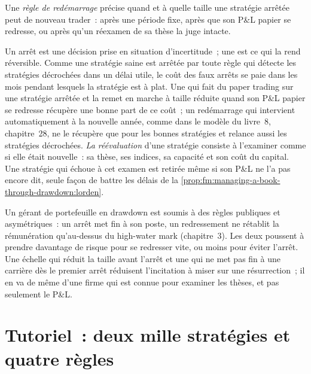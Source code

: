 \begin{definition}\label{def:fm:managing-a-book-through-drawdown:restart}
Une \emph{règle de redémarrage} précise quand et à quelle taille une stratégie arrêtée peut de nouveau trader~: après une période fixe, après que son
P\&L papier se redresse, ou après qu'un réexamen de sa thèse la juge intacte.
\end{definition}

Un arrêt est une décision prise en situation d'incertitude~; une  est ce qui la rend réversible. Comme une stratégie saine est arrêtée par toute règle qui
détecte les stratégies décrochées dans un délai utile, le coût des faux arrêts se paie dans les mois pendant lesquels la stratégie est à plat. Une  qui fait du paper trading sur une stratégie arrêtée
et la remet en marche à taille réduite quand son P\&L papier se redresse récupère une bonne part de ce coût~; un redémarrage qui intervient automatiquement
à la nouvelle année, comme dans le modèle du livre~8, chapitre~28, ne le récupère que pour les bonnes stratégies et relance aussi les stratégies décrochées.
\emph{La réévaluation} d'une stratégie consiste à l'examiner comme si elle était nouvelle~: sa thèse, ses indices, sa capacité et son coût du capital. Une
stratégie qui échoue à cet examen est retirée même si son P\&L ne l'a pas encore dit, seule façon de battre les délais de
la \cref{prop:fm:managing-a-book-through-drawdown:lorden}.

\begin{remark}\label{rem:fm:managing-a-book-through-drawdown:people}
Un gérant de portefeuille en drawdown est soumis à des règles publiques et asymétriques~: un arrêt met fin à son poste, un redressement ne rétablit la rémunération qu'au-dessus du
high-water mark (chapitre~3). Les deux poussent à prendre davantage de risque pour se redresser vite, ou moins pour éviter l'arrêt. Une échelle qui réduit la taille avant l'arrêt
et une  qui ne met pas fin à une carrière dès le premier arrêt réduisent l'incitation à miser sur une résurrection~; il en va de même d'une firme qui est
connue pour examiner les thèses, et pas seulement le P\&L.
\end{remark}

\section{Tutoriel~: deux mille stratégies et quatre règles}\label{tut:fm:managing-a-book-through-drawdown:tut}


